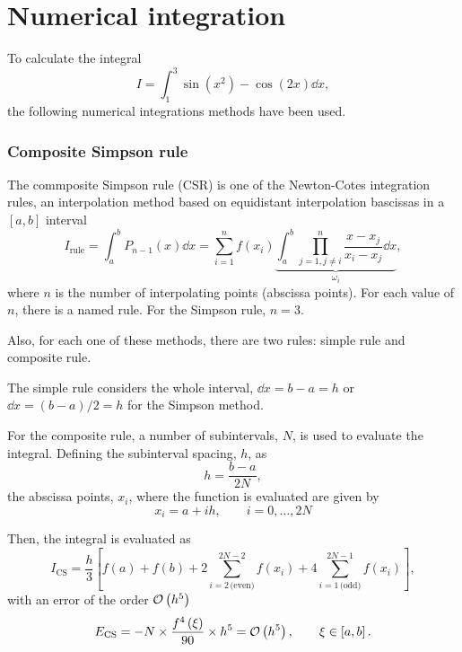\graphicspath{{./figures/}}
\part{Numerical integration}
To calculate the integral 
\begin{equation}\label{eq:integral}
    I = \int_1^3 \sin \left( x^2 \right) - \cos \left( 2x \right) \dd{x},
\end{equation}
the following numerical integrations methods have been used.

\section{Composite Simpson rule}
The commposite Simpson rule (CSR) is one of the Newton-Cotes integration rules,
an interpolation method based on equidistant interpolation bascissas in a $\left[ a,b \right]$ 
interval 
\begin{equation}
    I_{\text{rule}} 
    = \int_a^b P_{n-1} \left( x \right) \dd{x} 
    = \sum_{i = 1}^{n} f\left( x_i \right) \underbrace{\int_a^b \prod_{j=1,j\not=i}^{n} \frac{ x - x_j }{x_i - x_j} \dd{x}}_{\omega_i} ,
\end{equation}
where $n$ is the number of interpolating points (abscissa points). 
For each value of $n$, there is a named rule. For the Simpson rule, $n = 3$.

Also, for each one of these methods, there are two rules: simple rule and composite rule.

The simple rule considers the whole interval, $\dd{x} = b - a = h$ or $\dd{x} = (b - a) / 2 = h$ 
for the Simpson method.

For the composite rule, a number of subintervals, $N$, is used to evaluate the integral. 
Defining the subinterval spacing, $h$, as 
\begin{equation}
    h = \frac{ b - a }{2N},
\end{equation}
the abscissa points, $x_i$, where the function is evaluated are given by 
\begin{equation}
    x_i = a + ih, \qquad i = 0, \ldots , 2N
\end{equation}

Then, the integral is evaluated as 
\begin{equation}
    I_{\text{CS}} =
    \frac{h}{3} \left[ f\left( a \right) + f\left( b \right) +
    2 \sum_{i = 2\, \text{(even)}}^{2N - 2} f\left( x_i \right) +
    4 \sum_{i = 1\, \text{(odd)}}^{2N - 1}  f\left( x_i \right) \right],
\end{equation}
with an error of the order $\mathcal{O} \left( h^5 \right)$
\begin{equation}
    E_{\text{CS}} =
    - N \times \frac{ f^4 \left( \xi \right) }{90} \times h^5 
    = \mathcal{O} \left( h^5 \right),
    \qquad \xi \in \left[ a,b \right].
\end{equation}

